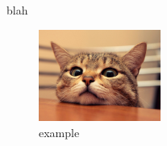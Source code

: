 \documentclass[PICOReport.tex]{subfiles}
\begin{document}
blah

\begin{figure}[!htb]
\centering
\includegraphics[width=4cm]{images/example}
\caption{example}
\label{fig:im_4}
\end{figure}
\end{document}

